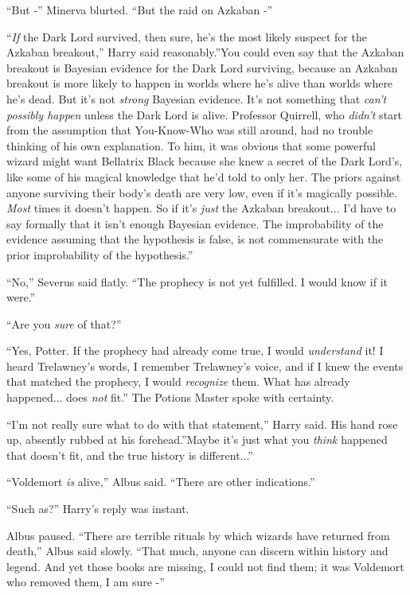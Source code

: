 ``But -'' Minerva blurted. ``But the raid on Azkaban -''

``\emph{If} the Dark Lord survived, then sure, he's the most likely
suspect for the Azkaban breakout,'' Harry said reasonably.''You could
even say that the Azkaban breakout is Bayesian evidence for the Dark
Lord surviving, because an Azkaban breakout is more likely to happen in
worlds where he's alive than worlds where he's dead. But it's not
\emph{strong} Bayesian evidence. It's not something that \emph{can't
possibly happen} unless the Dark Lord is alive. Professor Quirrell, who
\emph{didn't} start from the assumption that You-Know-Who was still
around, had no trouble thinking of his own explanation. To him, it was
obvious that some powerful wizard might want Bellatrix Black because she
knew a secret of the Dark Lord's, like some of his magical knowledge
that he'd told to only her. The priors against anyone surviving their
body's death are very low, even if it's magically possible. \emph{Most}
times it doesn't happen. So if it's \emph{just} the Azkaban
breakout... I'd have to say formally that it isn't enough Bayesian
evidence. The improbability of the evidence assuming that the hypothesis
is false, is not commensurate with the prior improbability of the
hypothesis.''

``No,'' Severus said flatly. ``The prophecy is not yet fulfilled. I
would know if it were.''

``Are you \emph{sure} of that?''

``Yes, Potter. If the prophecy had already come true, I would
\emph{understand} it! I heard Trelawney's words, I remember Trelawney's
voice, and if I knew the events that matched the prophecy, I would
\emph{recognize} them. What has already happened... does \emph{not}
fit.'' The Potions Master spoke with certainty.

``I'm not really sure what to do with that statement,'' Harry said. His
hand rose up, absently rubbed at his forehead.''Maybe it's just what you
\emph{think} happened that doesn't fit, and the true history is
different...''

``Voldemort \emph{is} alive,'' Albus said. ``There are other
indications.''

``Such as?'' Harry's reply was instant.

Albus paused. ``There are terrible rituals by which wizards have
returned from death,'' Albus said slowly. ``That much, anyone can
discern within history and legend. And yet those books are missing, I
could not find them; it was Voldemort who removed them, I am sure -''

